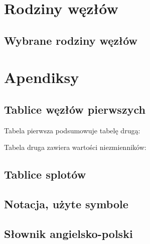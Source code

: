 \documentclass{LegrandOrangeBook}
\begin{document}
\part{Rodziny węzłów}
\chapter{Wybrane rodziny węzłów}










\part{Apendiksy}
\chapterspaceabove{5.75cm} %
\chapterspacebelow{7.25cm} %

\begin{appendices}
	\renewcommand{\chaptername}{Appendix} %
	\chapter{Tablice węzłów pierwszych}
	
	Tabela pierwsza podsumowuje tabelę drugą:
	
	\newpage
	Tabela druga zawiera wartości niezmienników:
	
	

	\chapter{Tablice splotów}
	

	\chapter{Notacja, użyte symbole}
	

	\chapter{Słownik angielsko-polski}
	\begin{compactitem}
	
	\end{compactitem}
\end{appendices}


\end{document}
